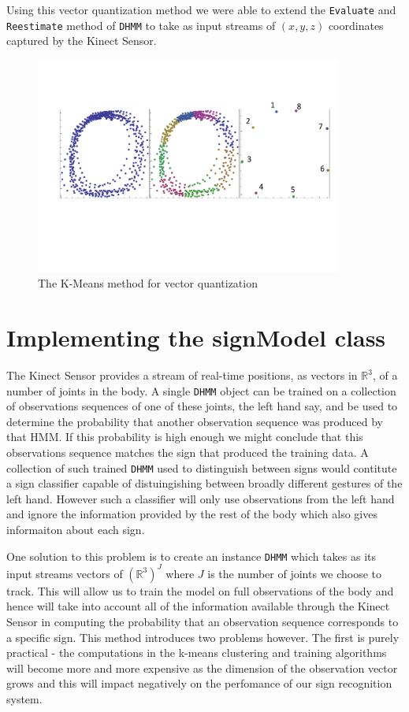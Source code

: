 Using this vector quantization method we were able to extend the \verb|Evaluate| and \verb|Reestimate| method of \verb|DHMM| to take as input streams of $(x,y,z)$ coordinates captured by the Kinect Sensor.

\begin{figure}[h!]
        \centering
        \includegraphics[width=0.9\textwidth]{ThesisFigs/ClusteringDiag}
        \caption{The K-Means method for vector quantization}\label{fig:kmeans}
\end{figure}

\section{Implementing the signModel class}
The Kinect Sensor provides a stream of real-time positions, as vectors in $\mathbb{R}^3$, of a number of joints in the body. A single \verb|DHMM| object can be trained on a collection of observations sequences of one of these joints, the left hand say, and be used to determine the probability that another observation sequence was produced by that HMM. If this probability is high enough we might conclude that this observations sequence matches the sign that produced the training data. A collection of such trained \verb|DHMM| used to distinguish between signs would contitute a sign classifier capable of distuingishing between broadly different gestures of the left hand. However such a classifier will only use observations from the left hand and ignore the information provided by the rest of the body which also gives informaiton about each sign.

One solution to this problem is to create an instance \verb|DHMM| which takes as its input streams vectors of $(\mathbb{R}^3)^J$ where $J$ is the number of joints we choose to track. This will allow us to train the model on full observations of the body and hence will take into account all of the information available through the Kinect Sensor in computing the probability that an observation sequence corresponds to a specific sign. This method introduces two problems however. The first is purely practical - the computations in the k-means clustering and training algorithms will become more and more expensive as the dimension of the observation vector grows and this will impact negatively on the perfomance of our sign recognition system.

